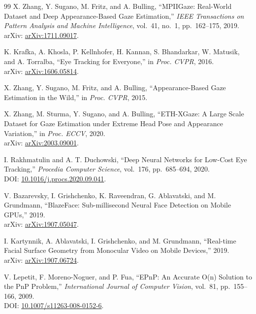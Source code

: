 \documentclass[10pt,a4paper]{article}
\begin{document}
\begin{thebibliography}{99}
X. Zhang, Y. Sugano, M. Fritz, and A. Bulling, ``MPIIGaze: Real-World Dataset and Deep Appearance-Based Gaze Estimation,'' \emph{IEEE Transactions on Pattern Analysis and Machine Intelligence}, vol.~41, no.~1, pp.~162--175, 2019.\\
arXiv: \href{https://arxiv.org/abs/1711.09017}{arXiv:1711.09017}.

K. Krafka, A. Khosla, P. Kellnhofer, H. Kannan, S. Bhandarkar, W. Matusik, and A. Torralba, ``Eye Tracking for Everyone,'' in \emph{Proc. CVPR}, 2016.\\
arXiv: \href{https://arxiv.org/abs/1606.05814}{arXiv:1606.05814}.

X. Zhang, Y. Sugano, M. Fritz, and A. Bulling, ``Appearance-Based Gaze Estimation in the Wild,'' in \emph{Proc. CVPR}, 2015.

X. Zhang, M. Sturma, Y. Sugano, and A. Bulling, ``ETH-XGaze: A Large Scale Dataset for Gaze Estimation under Extreme Head Pose and Appearance Variation,'' in \emph{Proc. ECCV}, 2020.\\
arXiv: \href{https://arxiv.org/abs/2003.09001}{arXiv:2003.09001}.

I. Rakhmatulin and A. T. Duchowski, ``Deep Neural Networks for Low-Cost Eye Tracking,'' \emph{Procedia Computer Science}, vol.~176, pp.~685--694, 2020.\\
DOI: \href{https://doi.org/10.1016/j.procs.2020.09.041}{10.1016/j.procs.2020.09.041}.

V. Bazarevsky, I. Grishchenko, K. Raveendran, G. Ablavatski, and M. Grundmann, ``BlazeFace: Sub-millisecond Neural Face Detection on Mobile GPUs,'' 2019.\\
arXiv: \href{https://arxiv.org/abs/1907.05047}{arXiv:1907.05047}.

I. Kartynnik, A. Ablavatski, I. Grishchenko, and M. Grundmann, ``Real-time Facial Surface Geometry from Monocular Video on Mobile Devices,'' 2019.\\
arXiv: \href{https://arxiv.org/abs/1907.06724}{arXiv:1907.06724}.

V. Lepetit, F. Moreno-Noguer, and P. Fua, ``EPnP: An Accurate O(n) Solution to the PnP Problem,'' \emph{International Journal of Computer Vision}, vol.~81, pp.~155--166, 2009.\\
DOI: \href{https://doi.org/10.1007/s11263-008-0152-6}{10.1007/s11263-008-0152-6}.


\end{thebibliography}
\end{document}
